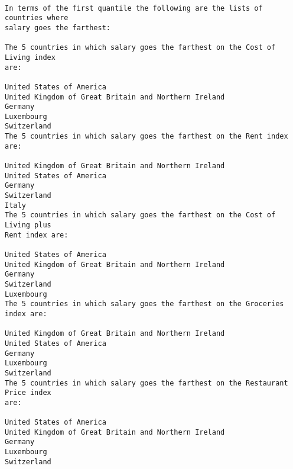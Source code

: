 \documentclass[11pt]{article}
\begin{document}
    \begin{center}
    \end{center}
    { \hspace*{\fill} \\}
    
    \begin{Verbatim}[commandchars=\\\{\}]
In terms of the first quantile the following are the lists of countries where
salary goes the farthest:

The 5 countries in which salary goes the farthest on the Cost of Living index
are:

United States of America
United Kingdom of Great Britain and Northern Ireland
Germany
Luxembourg
Switzerland
The 5 countries in which salary goes the farthest on the Rent index are:

United Kingdom of Great Britain and Northern Ireland
United States of America
Germany
Switzerland
Italy
The 5 countries in which salary goes the farthest on the Cost of Living plus
Rent index are:

United States of America
United Kingdom of Great Britain and Northern Ireland
Germany
Switzerland
Luxembourg
The 5 countries in which salary goes the farthest on the Groceries index are:

United Kingdom of Great Britain and Northern Ireland
United States of America
Germany
Luxembourg
Switzerland
The 5 countries in which salary goes the farthest on the Restaurant Price index
are:

United States of America
United Kingdom of Great Britain and Northern Ireland
Germany
Luxembourg
Switzerland
    \end{Verbatim}
\end{document}
